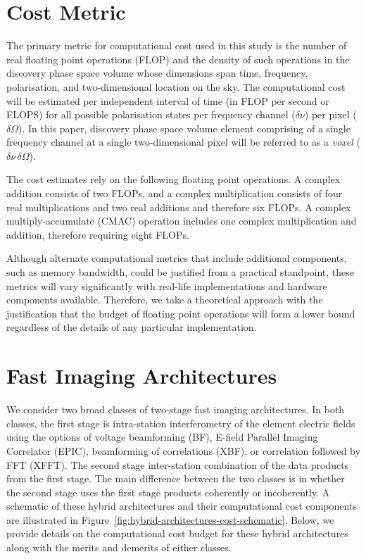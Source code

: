 \documentclass[
  journal=pasa,
  manuscript=article-type,
  year=2020,
  volume=37,
]{cup-journal}
\begin{document}
\section{Cost Metric} \label{sec:computational-cost}

The primary metric for computational cost used in this study is the number of real floating point operations (FLOP) and the density of such operations in the discovery phase space volume whose dimensions span time, frequency, polarisation, and two-dimensional location on the sky. The computational cost will be estimated per independent interval of time (in FLOP per second or FLOPS) for all possible polarisation states per frequency channel ($\delta\nu$) per pixel ($\delta\Omega$). In this paper, discovery phase space volume element comprising of a single frequency channel at a single two-dimensional pixel will be referred to as a \textit{voxel} ($\delta\nu\,\delta\Omega$).

The cost estimates rely on the following floating point operations. A complex addition consists of two FLOPs, and a complex multiplication consists of four real multiplications and two real additions and therefore six FLOPs. A complex multiply-accumulate (CMAC) operation includes one complex multiplication and addition, therefore requiring eight FLOPs.

Although alternate computational metrics that include additional components, such as memory bandwidth, could be justified from a practical standpoint, these metrics will vary significantly with real-life implementations and hardware components available. Therefore, we take a theoretical approach with the justification that the budget of floating point operations will form a lower bound regardless of the details of any particular implementation. 

\section{Fast Imaging Architectures} \label{sec:img-archs}


We consider two broad classes of two-stage fast imaging architectures. In both classes, the first stage is intra-station interferometry of the element electric fields using the options of voltage beamforming (BF), E-field Parallel Imaging Correlator (EPIC), beamforming of correlations (XBF), or correlation followed by FFT (XFFT). The second stage inter-station combination of the data products from the first stage. The main difference between the two classes is in whether the second stage uses the first stage products coherently or incoherently. A schematic of these hybrid architectures and their computational cost components are illustrated in Figure~\ref{fig:hybrid-architectures-cost-schematic}. Below, we provide details on the computational cost budget for these hybrid architectures along with the merits and demerits of either classes. 
\end{document}
